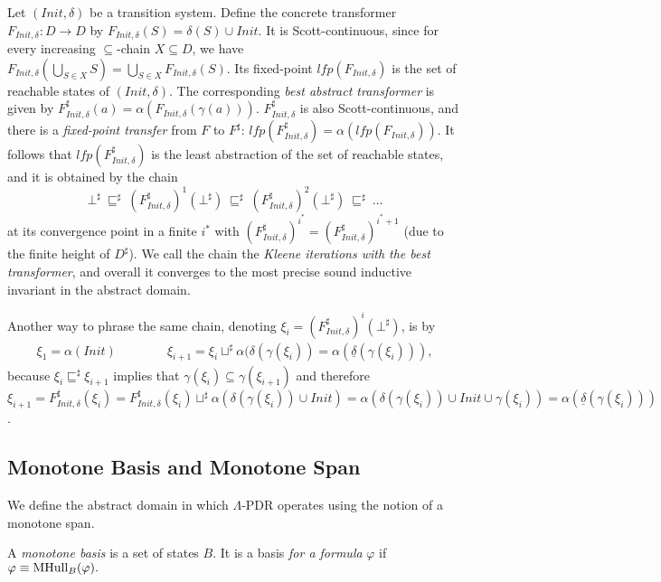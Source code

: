 \documentclass[acmsmall,screen]{acmart}
\newcommand{\Init}{{\textit{Init}}}
\newcommand{\tr}{\delta}
\newcommand{\reflextr}[1]{\underline{#1}}
\newcommand{\postimage}[2]{{\reflextr{#1}}({#2})}
\newcommand{\sleq}{\sqsubseteq}
\newcommand{\mhull}[2]{{\rm MHull}_{#2}({#1})}
\newcommand{\abs}[1]{{#1}^{\sharp}}
\newcommand{\join}{\mathbin{\sqcup}}
\begin{document}
Let $(\Init,\tr)$ be a transition system.
%
Define the concrete transformer $F_{\Init,\tr}: D \to D$ by $F_{\Init,\tr}(S) = \tr(S) \cup \Init$. It is Scott-continuous, since
%
for every increasing $\subseteq$-chain $X \subseteq D$, we have $F_{\Init,\tr}(\bigcup_{S \in X} S) = \bigcup_{S \in X}{F_{\Init,\tr}(S)}$.
%
Its fixed-point $\textit{lfp}(F_{\Init,\tr})$ is the set of reachable states of $(\Init,\tr)$.
The corresponding \emph{best abstract transformer} is given by $\abs{F}_{\Init,\tr}(a) = \alpha(F_{\Init,\tr}(\gamma(a)))$. $\abs{F}_{\Init,\tr}$ is also Scott-continuous, and there is
a \emph{fixed-point transfer} from $F$ to $\abs{F}$: $\textit{lfp}(\abs{F}_{\Init,\tr}) = \alpha(\textit{lfp}(F_{\Init,\tr}))$.
It follows that $\textit{lfp}(\abs{F}_{\Init,\tr})$ is the least abstraction of the set of reachable states, and it is obtained by the chain
\begin{equation*}
	\abs{\bot} \ \abs{\sleq} \ (\abs{F}_{\Init,\tr})^{1}(\abs{\bot}) \ \abs{\sleq} \ (\abs{F}_{\Init,\tr})^2(\abs{\bot}) \ \abs{\sleq} \ \ldots
\end{equation*}
at its convergence point in a finite $i^*$ with $(\abs{F}_{\Init,\tr})^{i^*} = (\abs{F}_{\Init,\tr})^{i^*+1}$ (due to the finite height of $\abs{D}$).
We call the chain the \emph{Kleene iterations with the best transformer}, and overall it converges to the most precise sound inductive invariant in the abstract domain.
%
%
%

%
%
%
%
%
%
%
Another way to phrase the same chain, denoting $\xi_i=(\abs{F}_{\Init,\tr})^{i}(\abs{\bot})$, is by
\begin{align*}
	\xi_1 = \alpha(\Init) \qquad \qquad \xi_{i+1}=\xi_i \mathbin{\abs{\join}} \alpha(\tr(\gamma(\xi_i))=\alpha(\postimage{\tr}{\gamma(\xi_i)}),
\end{align*}
because
$\xi_i \abs{\sleq} \xi_{i+1}$ implies that $\gamma(\xi_i) \subseteq \gamma(\xi_{i+1})$ and therefore
%
$\xi_{i+1}=\abs{F}_{\Init,\tr}(\xi_i) = \abs{F}_{\Init,\tr}(\xi_i) \mathbin{\abs{\join}} \alpha(\tr(\gamma(\xi_i)) \cup \Init) = \alpha(\tr(\gamma(\xi_i)) \cup \Init \cup \gamma(\xi_i)) = \alpha(\postimage{\tr}{\gamma(\xi_i)})$.
%
%
%

\subsection{Monotone Basis and Monotone Span}
\label{sec:monotone-basis}
We define the abstract domain in which $\Lambda$-PDR operates using the notion of a monotone span.
\begin{definition}
\label{def:monotone-basis}
A \emph{monotone basis} is a set of states $B$.
It is a basis \emph{for a formula} $\varphi$ if
$
	\varphi \equiv \mhull{\varphi}{B}.
$
%
%

%
%
%
\end{definition}
\end{document}
